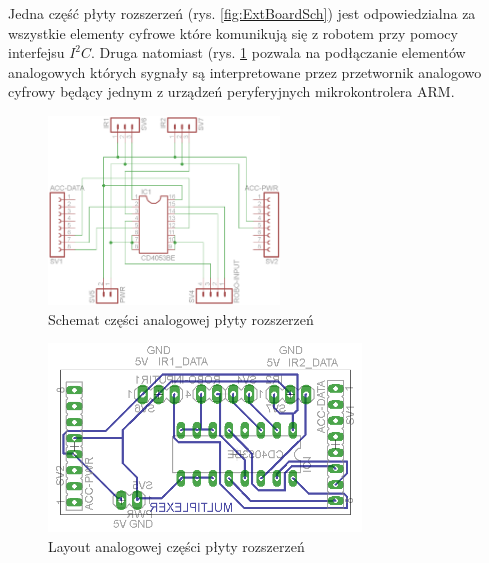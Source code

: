 Jedna część płyty rozszerzeń (rys. \ref{fig:ExtBoardSch}) jest odpowiedzialna za
wszystkie elementy cyfrowe które komunikują się z robotem przy pomocy interfejsu
$I^{2}C$. Druga natomiast (rys. \ref{fig:AdcMultiplexerSch} pozwala na
podłączanie elementów analogowych których sygnały są interpretowane przez
przetwornik analogowo cyfrowy będący jednym z urządzeń peryferyjnych
mikrokontrolera ARM.

\begin{figure}[!ht]
 \centering
 \includegraphics[height=50mm]{../images/ch04/adcmultiplexer-sch.png}
 \caption{Schemat części analogowej płyty rozszerzeń}
 \label{fig:AdcMultiplexerSch}
\end{figure}

\begin{figure}[!ht]
 \centering
 \includegraphics[height=50mm]{../images/ch04/adcmultiplexer-brd.png}
 \caption{Layout analogowej części płyty rozszerzeń}
 \label{fig:AdcMultiplexerPCB}
\end{figure}